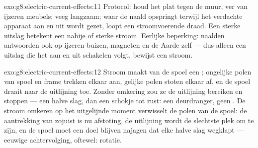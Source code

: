 \begin{solution}{exo:g8:electric-current-effects:11}
Protocol: houd het  plat tegen de muur, ver van ijzeren
meubels; veeg langzaam; waar de naald opspringt terwijl het verdachte
apparaat aan en uit wordt gezet, loopt een stroomvoerende draad. Een
sterke uitslag betekent een nabije of sterke stroom. Eerlijke
beperking: naalden antwoorden ook op ijzeren buizen,
magneten en de Aarde zelf --- dus alleen een uitslag die het aan
en uit schakelen volgt, bewijst een stroom.
\end{solution}

\begin{solution}{exo:g8:electric-current-effects:12}
Stroom maakt van de spoel een ; ongelijke polen van spoel
en frame trekken elkaar aan, gelijke polen stoten elkaar af, en de
spoel draait naar de uitlijning toe. Zonder omkering zou ze de
uitlijning bereiken en stoppen --- een halve slag, dan een schokje tot
rust: een deurdranger, geen . De stroom omkeren op het
uitgelijnde moment verwisselt de polen van de spoel: de aantrekking van
zojuist is nu afstoting, de uitlijning wordt de slechtste plek om te
zijn, en de spoel moet een doel blijven najagen dat elke halve slag
wegklapt --- eeuwige achtervolging, oftewel: rotatie.
\end{solution}

